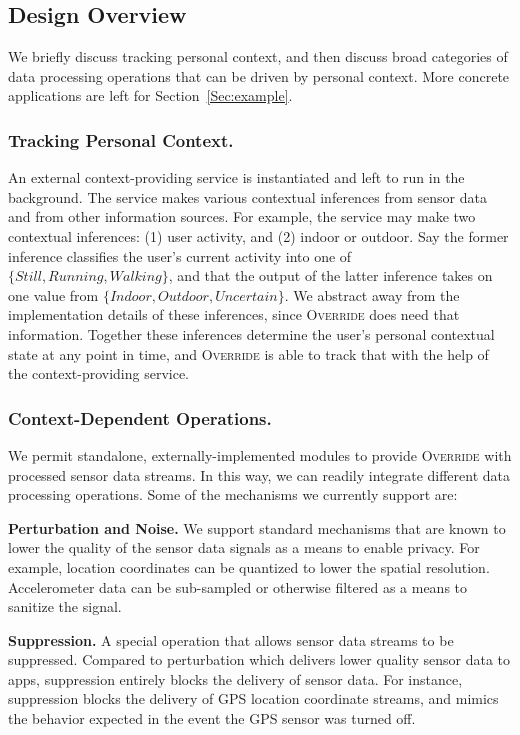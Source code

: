 \documentclass[10pt]{sensys-proc}
\begin{document}
\subsection{Design Overview}

We briefly discuss tracking personal context, and then discuss broad categories of data processing operations that can be driven by personal context. More concrete applications are left for Section~\ref{Sec:example}.

\subsubsection{Tracking Personal Context.}

An external context-providing service is instantiated and left to run in the background. The service makes various contextual inferences from sensor data and from other information sources. For example, the service may make two contextual inferences: (1) user activity, and (2) indoor or outdoor. Say the former inference classifies the user's current activity into one of $\{Still, Running, Walking\}$, and that the output of the latter inference takes on one value from $\{Indoor, Outdoor, Uncertain\}$. We abstract away from the implementation details of these inferences, since \textsc{Override} does need that information. Together these inferences determine the user's personal contextual state at any point in time, and \textsc{Override} is able to track that with the help of the context-providing service.

\subsubsection{Context-Dependent Operations.}
We permit standalone, externally-implemented modules to provide \textsc{Override} with processed sensor data streams. In this way, we can readily integrate different data processing operations. Some of the mechanisms we currently support are:

\textbf{Perturbation and Noise.} We support standard mechanisms that are known to lower the quality of the sensor data signals as a means to enable privacy. For example, location coordinates can be quantized to lower the spatial resolution. Accelerometer data can be sub-sampled or otherwise filtered as a means to sanitize the signal.

\textbf{Suppression.} A special operation that allows sensor data streams to be suppressed. Compared  to perturbation which delivers lower quality sensor data to apps, suppression entirely blocks the delivery of sensor data. For instance, suppression blocks the delivery of GPS location coordinate streams, and mimics the behavior expected in the event the GPS sensor was turned off.
\end{document}

